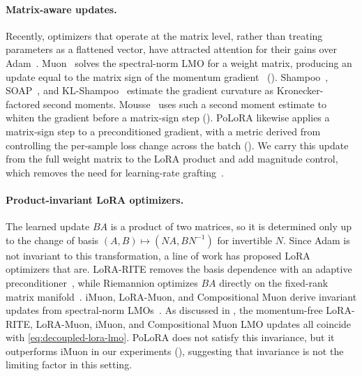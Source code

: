 \documentclass[11pt]{article}
\newcommand{\methodname}{PoLoRA\xspace}
\theoremstyle{plain}
\theoremstyle{definition}
\theoremstyle{remark}
\theoremstyle{definition}
\begin{document}
\paragraph{Matrix-aware updates.}
Recently, optimizers that operate at the matrix level, rather than treating parameters as
a flattened vector, have attracted attention for their gains over Adam~\cite{liu2025muon,
qiu2026hyperparameter, benchmark_practices}. Muon~\cite{muon} solves the spectral-norm LMO
for a weight matrix, producing an update equal to the matrix sign of the momentum
gradient~\cite{polarexpress} (). Shampoo~\cite{shampoo},
SOAP~\cite{soap}, and KL-Shampoo~\cite{klshampoo} estimate the gradient curvature as
Kronecker-factored second moments. Mousse~\cite{mousse} uses such a second moment estimate to
whiten the gradient before a matrix-sign step (). \methodname{} likewise applies a matrix-sign step to a preconditioned gradient, with a metric derived from controlling the per-sample loss change across the batch (). We carry this update from the full weight matrix to the LoRA product and add magnitude control, which removes the need for learning-rate grafting~\cite{shi2023distributed, mousse}.

\paragraph{Product-invariant LoRA optimizers.}
The learned update $BA$ is a product of two matrices, so it is determined only up to the
change of basis $(A,B)\mapsto(NA,BN^{-1})$ for invertible $N$. Since Adam is not invariant
to this transformation, a line of work has proposed LoRA optimizers that are. LoRA-RITE
removes the basis dependence with an adaptive preconditioner~\cite{lorarite}, while Riemannion
optimizes $BA$ directly on the fixed-rank matrix manifold~\cite{riemannion}. iMuon, LoRA-Muon, and Compositional Muon derive invariant updates from
spectral-norm LMOs~\cite{imuon,loramuon,tilde_csd}. As discussed in , the momentum-free LoRA-RITE, LoRA-Muon,
iMuon, and Compositional Muon LMO updates all coincide with \eqref{eq:decoupled-lora-lmo}. \methodname{} does not satisfy this invariance, but it outperforms iMuon in our experiments (), suggesting that invariance is not the limiting factor in this setting.
\end{document}
